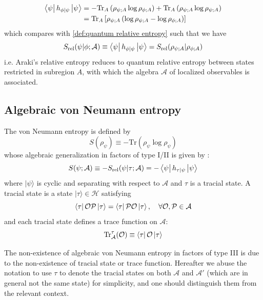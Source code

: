 \documentclass[a4paper,11pt]{article}
\newcommand{\ket}[1]{| #1 \rangle } %
\newcommand{\diracprod}[3]{\left\langle  #1 \vphantom{#2#3} \right|#2 \left| #3 \vphantom{#1#2} \right\rangle } %
\renewcommand{\=}[1]{\stackrel{#1}{=}} %
\def\A{\mathcal{A}}
\def\O{\mathcal{O}}
\def\P{\mathcal{P}}
\def\H{\mathcal{H}}
\def\Tr{\text{Tr}}
\def\Srel{S_{\text{rel}}}
\begin{document}
\begin{equation}
	\begin{aligned}
		\diracprod{\psi}{h_{\phi|\psi}}{\psi}&=-\Tr_A\left(\rho_{\psi;A}\log\rho_{\phi;A}\right)+\Tr_A\left(\rho_{\psi;A}\log\rho_{\psi;A}\right)\\
		&=\Tr_A\left[\rho_{\psi;A}\left(\log\rho_{\psi;A}-\log\rho_{\phi;A}\right)\right]
	\end{aligned}
\end{equation}
which compares with \eqref{def:quantum relative entropy} such that we have
\begin{equation}
	\Srel(\psi|\phi;\A)\equiv\diracprod{\psi}{h_{\phi|\psi}}{\psi}=\Srel(\rho_{\psi;A}|\rho_{\phi;A})
\end{equation}
i.e. Araki's relative entropy reduces to quantum relative entropy between states restricted in subregion $A$, with which the algebra $\A$ of localized observables is associated.




\subsection{Algebraic von Neumann entropy}\label{sec:algvNalg}

The von Neumann entropy is defined by
\begin{equation}
	S(\rho_{\psi})\equiv-\Tr\left(\rho_{\psi}\log\rho_{\psi}\right)
\end{equation}
whose algebraic generalization in factors of type I/II is given by \cite{segal1960note,ohya2004quantum,Longo:2022lod}:
\begin{equation}\label{eq:algvnentropy}
	S(\psi;\A)\equiv-\Srel(\psi|\tau;\A)=-\diracprod{\psi}{h_{\tau|\psi}}{\psi}
\end{equation}
where $\ket{\psi}$ is cyclic and separating with respect to $\A$ and $\tau$ is a tracial state. A tracial state is a state $\ket{\tau}\in\H$ satisfying
\begin{equation}
	\diracprod{\tau}{\O\P}{\tau}=\diracprod{\tau}{\P\O}{\tau},\quad \forall\O,\P\in\A
\end{equation}
and each tracial state defines a trace function on $\A$:
\begin{equation}\label{def:trace}
	\Tr_{\A}^\tau(\O)\equiv\diracprod{\tau}{\O}{\tau}
\end{equation}

The non-existence of algebraic von Neumann entropy in factors of type III is due to the non-existence of tracial state or trace function. Hereafter we abuse the notation to use $\tau$ to denote the tracial states on both $\A$ and $\A'$ (which are in general not the same state) for simplicity, and one should distinguish them from the relevant context.
\end{document}

